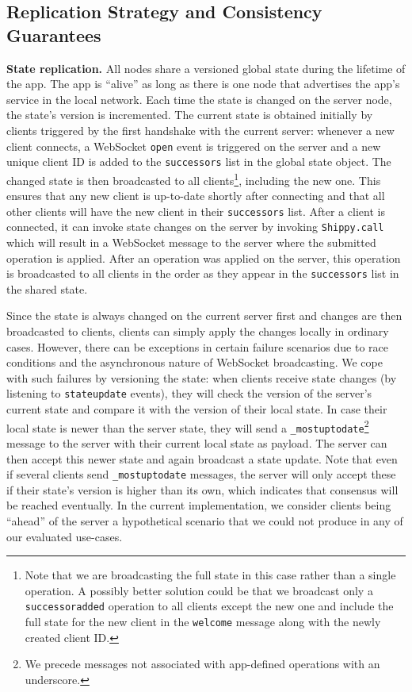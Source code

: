 \subsection{Replication Strategy and Consistency Guarantees}
\label{sub:approach_replication_strategy}

\textbf{State replication.}
All \APIshort nodes share a versioned global state during the lifetime of the app.
The app is ``alive'' as long as there is one node that advertises the app's service in the local network.
Each time the state is changed on the server node, the state's version is incremented.
The current state is obtained initially by clients triggered by the first handshake with the current server: whenever a new client connects, a WebSocket \texttt{open} event is triggered on the server and a new unique client ID is added to the \texttt{successors} list in the global state object.
The changed state is then broadcasted to all clients\footnote{Note that we are broadcasting the full state in this case rather than a single operation.
A possibly better solution could be that we broadcast only a \texttt{successoradded} operation to all clients except the new one and include the full state for the new client in the \texttt{welcome} message along with the newly created client ID.}, including the new one.
This ensures that any new client is up-to-date shortly after connecting and that all other clients will have the new client in their \texttt{successors} list.
After a client is connected, it can invoke state changes on the server by invoking \texttt{Shippy.call} which will result in a WebSocket message to the server where the submitted operation is applied.
After an operation was applied on the server, this operation is broadcasted to all clients in the order as they appear in the \texttt{successors} list in the shared state.

Since the state is always changed on the current server first and changes are then broadcasted to clients, clients can simply apply the changes locally in ordinary cases.
However, there can be exceptions in certain failure scenarios due to race conditions and the asynchronous nature of WebSocket broadcasting.
We cope with such failures by versioning the state: when clients receive state changes (by listening to \texttt{stateupdate} events), they will check the version of the server's current state and compare it with the version of their local state.
In case their local state is newer than the server state, they will send a \texttt{\_mostuptodate}\footnote{We precede messages not associated with app-defined operations with an underscore.} message to the server with their current local state as payload.
The server can then accept this newer state and again broadcast a state update.
Note that even if several clients send \texttt{\_mostuptodate} messages, the server will only accept these if their state's version is higher than its own, which indicates that consensus will be reached eventually.
In the current \APIshort implementation, we consider clients being ``ahead'' of the server a hypothetical scenario that we could not produce in any of our evaluated use-cases.


